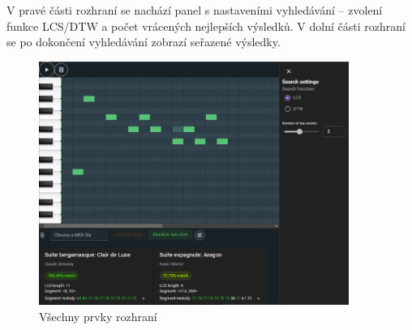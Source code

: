 V pravé části rozhraní se nachází panel s nastaveními vyhledávání -- zvolení funkce LCS/DTW a počet vrácených nejlepších výsledků. V dolní části rozhraní se po dokončení vyhledávání zobrazí seřazené výsledky.

\begin{figure}
    \centering
    \caption{Všechny prvky rozhraní}
    \includegraphics[width=0.9\textwidth]{images/interface.png}
\end{figure}